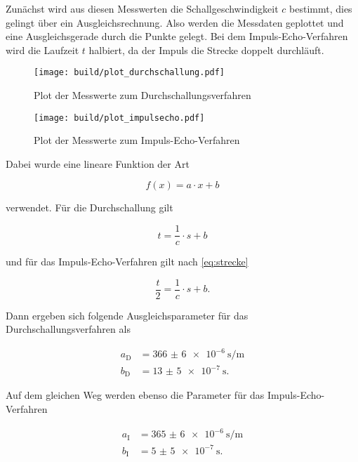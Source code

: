 Zunächst wird aus diesen Messwerten die Schallgeschwindigkeit $c$ bestimmt, dies gelingt über ein Ausgleichsrechnung.
Also werden die Messdaten geplottet und eine Ausgleichsgerade durch die Punkte gelegt.
Bei dem Impuls-Echo-Verfahren wird die Laufzeit $t$ halbiert, da der Impuls die Strecke doppelt durchläuft.

\begin{figure}
    \centering
    \texttt{[image: build/plot\_durchschallung.pdf]}
    \caption{Plot der Messwerte zum Durchschallungsverfahren}
    \label{fig:durch}
\end{figure}

\begin{figure}
    \centering
    \texttt{[image: build/plot\_impulsecho.pdf]}
    \caption{Plot der Messwerte zum Impuls-Echo-Verfahren}
    \label{fig:impuls}
\end{figure}

Dabei wurde eine lineare Funktion der Art 

\begin{equation}
    f(x) = a \cdot x + b 
\end{equation}

verwendet.
Für die Durchschallung gilt

\begin{equation}
    t = \frac{1}{c} \cdot s + b 
\end{equation}

und für das Impuls-Echo-Verfahren gilt nach \eqref{eq:strecke}

\begin{equation}
    \frac{t}{2} = \frac{1}{c} \cdot s + b.
\end{equation}

Dann ergeben sich folgende Ausgleichsparameter für das Durchschallungsverfahren als

\begin{align}
    a_\text{D} &= \SI{366(6)e-6}{\second\per\meter}\\
    b_\text{D} &= \SI{13(5)e-7}{\second}.
\end{align}

Auf dem gleichen Weg werden ebenso die Parameter für das Impuls-Echo-Verfahren 

\begin{align}
    a_\text{I} &= \SI{365(6)e-6}{\second\per\meter}\\
    b_\text{I} &= \SI{5(5)e-7}{\second}.
\end{align}

